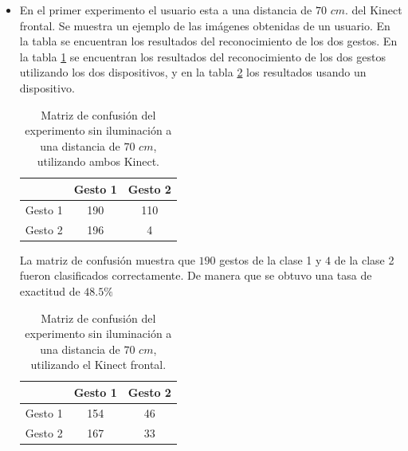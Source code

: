 
\begin{itemize}

\item En el primer experimento el usuario esta a una distancia de $70$ $cm.$ del Kinect frontal. Se muestra un ejemplo de las imágenes obtenidas de un usuario. En la tabla se encuentran los resultados del reconocimiento de los dos gestos. En la tabla \ref{table:70LnoK2} se encuentran los resultados del reconocimiento de los dos gestos utilizando los dos dispositivos, y en la tabla \ref{table:70LnoK1} los resultados usando un dispositivo.   


\begin{table}[h!] 
\begin{center}
\begin{tabular}{ r || c | c |} 
 
        & Gesto 1 & Gesto 2 \\ \hline \hline  
Gesto 1 & 190     &  110     \\ \hline  
Gesto 2 & 196     &  4     \\   

\end{tabular}
\end{center} 
\caption{Matriz de confusión del experimento sin iluminación a una distancia de $70$ $cm$, utilizando ambos Kinect.} 
\label{table:70LnoK2}
\end{table}  

La matriz de confusión muestra que $190$ gestos de la clase 1 y $4$ de la clase 2 fueron clasificados correctamente. De manera que se obtuvo una tasa de exactitud de $48.5 \%$ 

\begin{table}[h!] 
\begin{center}
\begin{tabular}{ r || c | c |} 
        & Gesto 1 & Gesto 2 \\ \hline \hline  
Gesto 1 & 154     &  46     \\ \hline  
Gesto 2 & 167     &  33     \\   
\end{tabular}
\end{center} 
\caption{Matriz de confusión del experimento sin iluminación a una distancia de $70$ $cm$, utilizando el Kinect frontal.}
\label{table:70LnoK1} 
\end{table}  


\end{itemize}
